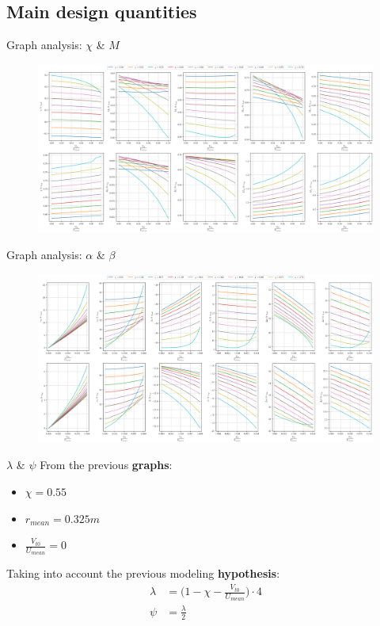 \subsection{Main design quantities}
	\begin{frame}{Graph analysis: $\chi$ \& $M$}
		\begin{figure}
			\centering
			\includegraphics[width=\textwidth]{figures/reactionStudy0.png}
		\end{figure}
	\end{frame}
	\begin{frame}{Graph analysis: $\alpha$ \& $\beta$}
		\begin{figure}
			\centering
			\includegraphics[width=\textwidth]{figures/reactionStudy1.png}
		\end{figure}
	\end{frame}
	\begin{frame}{$\lambda$ \& $\psi$}
		From the previous \textbf{graphs}:
			\begin{itemize}
				\item $\chi = 0.55$
				\item $r_{mean} = 0.325 m$
				\item $\frac{V_{t0}}{U_{mean}} = 0$
			\end{itemize}
		Taking into account the previous modeling \textbf{hypothesis}:
		\begin{align}
			\lambda & = \Bigg( 1 - \chi - \frac{V_{t0}}{U_{mean}} \Bigg) \cdot 4 \nonumber \\
			\psi    & = \frac{\lambda}{2} \nonumber
		\end{align}
	\end{frame}
	
